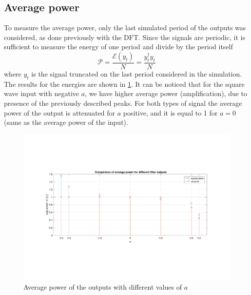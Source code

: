 \subsection{Average power}
To measure the average power, only the last simulated period of the outputs was considered, as done previously with the DFT. Since the signals are periodic, it is sufficient to measure the energy of one period and divide by the period itself
\begin{equation}
\mathcal{P}=\frac{\mathcal{E}(y_t)}{N}=\frac{y_t^\dagger y_t}{N}
\end{equation}
where $y_t$ is the signal truncated on the last period considered in the simulation.
The results for the energies are shown in \cref{fig:t1_power}. It can be noticed that for the square wave input with negative $a$, we have higher average power (amplification), due to presence of the previously described peaks. For both types of signal the average power of the output is attenuated for $a$ positive, and it is equal to 1 for $a=0$ (same as the average power of the input).
\begin{figure} [H]
	\centering
	\includegraphics[trim={2.5cm 5cm 2.5cm 5cm}, clip, width=0.7\linewidth]{power}
	\caption{Average power of the outputs with different values of $a$}
	\label{fig:t1_power}
\end{figure}

